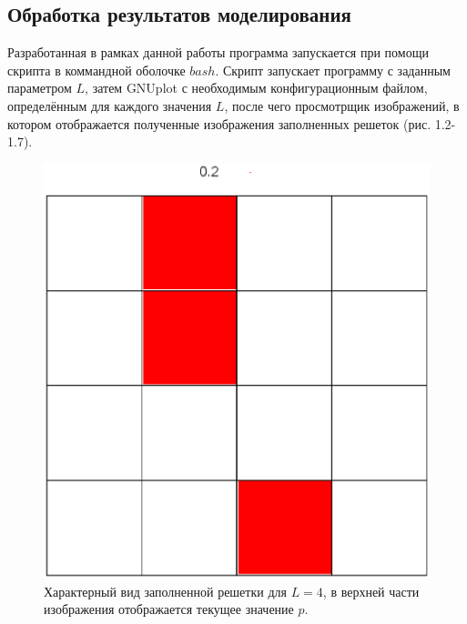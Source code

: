\documentclass[14pt,a4paper,report]{ncc}
\begin{document}
\subsection{Обработка результатов моделирования}
Разработанная в рамках данной работы программа запускается при помощи скрипта в коммандной оболочке $bash$. Скрипт запускает программу с заданным параметром $L$, затем GNUplot с необходимым конфигурационным файлом, определённым для каждого значения $L$, после чего просмотрщик изображений, в котором отображается полученные изображения заполненных решеток (рис. 1.2-1.7).
\ 


\begin{figure}[h!]
\begin{center}
\begin{minipage}[h!]{0.38\linewidth}
\includegraphics[width=1\linewidth]{L4_1}
\caption{Характерный вид заполненной решетки для $L=4$, в верхней части изображения отображается текущее значение $p$.} %
\label{ris:experimoriginal} %
\end{minipage}
\hfill
\begin{minipage}[h!]{0.45\linewidth}

\end{minipage}
\end{center}
\end{figure}
\end{document}

